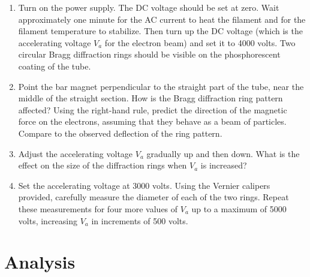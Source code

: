 \documentclass{tufte-handout}
\begin{document}
\begin{enumerate}
\item Turn on the power supply. The DC voltage should be set at zero.  Wait
  approximately one minute for the AC current to heat the filament and for the
  filament temperature to stabilize.  Then turn up the DC voltage (which is the
  accelerating voltage $V_a$ for the electron beam) and set it to 4000 volts.
  Two circular Bragg diffraction rings should be visible on the phosphorescent
  coating of the tube.

\item Point the bar magnet perpendicular to the straight part of the tube, near
  the middle of the straight section.  How is the Bragg diffraction ring pattern
  affected?  Using the right-hand rule, predict the direction of the magnetic
  force on the electrons, assuming that they behave as a beam of particles.
  Compare to the observed deflection of the ring pattern.

\item Adjust the accelerating voltage $V_a$ gradually up and then down.  What is
  the effect on the size of the diffraction rings when $V_a$ is
  increased?

\item Set the accelerating voltage at 3000 volts.  Using the Vernier calipers
  provided, carefully measure the diameter of each of the two rings.  Repeat
  these measurements for four more values of $V_a$ up to a maximum of 5000
  volts, increasing $V_a$ in increments of 500 volts.
\end{enumerate}

\section{Analysis}
\end{document}
